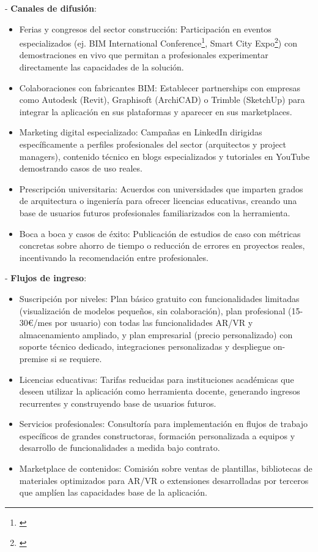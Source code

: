 - \textbf{Canales de difusión}:
\begin{itemize}
\item Ferias y congresos del sector construcción: Participación en eventos especializados (ej. BIM International Conference\footnote{\cite{eubim}}, Smart City Expo\footnote{\cite{smartcityexpo}}) con demostraciones en vivo que permitan a profesionales experimentar directamente las capacidades de la solución.
\item Colaboraciones con fabricantes BIM: Establecer partnerships con empresas como Autodesk (Revit), Graphisoft (ArchiCAD) o Trimble (SketchUp) para integrar la aplicación en sus plataformas y aparecer en sus marketplaces.
\item Marketing digital especializado: Campañas en LinkedIn dirigidas específicamente a perfiles profesionales del sector (arquitectos y project managers), contenido técnico en blogs especializados y tutoriales en YouTube demostrando casos de uso reales.
\item Prescripción universitaria: Acuerdos con universidades que imparten grados de arquitectura o ingeniería para ofrecer licencias educativas, creando una base de usuarios futuros profesionales familiarizados con la herramienta.
\item Boca a boca y casos de éxito: Publicación de estudios de caso con métricas concretas sobre ahorro de tiempo o reducción de errores en proyectos reales, incentivando la recomendación entre profesionales.
\end{itemize}
- \textbf{Flujos de ingreso}:
\begin{itemize}
\item Suscripción por niveles: Plan básico gratuito con funcionalidades limitadas (visualización de modelos pequeños, sin colaboración), plan profesional (15-30€/mes por usuario) con todas las funcionalidades AR/VR y almacenamiento ampliado, y plan empresarial (precio personalizado) con soporte técnico dedicado, integraciones personalizadas y despliegue on-premise si se requiere.
\item Licencias educativas: Tarifas reducidas para instituciones académicas que deseen utilizar la aplicación como herramienta docente, generando ingresos recurrentes y construyendo base de usuarios futuros.
\item Servicios profesionales: Consultoría para implementación en flujos de trabajo específicos de grandes constructoras, formación personalizada a equipos y desarrollo de funcionalidades a medida bajo contrato.
\item Marketplace de contenidos: Comisión sobre ventas de plantillas, bibliotecas de materiales optimizados para AR/VR o extensiones desarrolladas por terceros que amplíen las capacidades base de la aplicación.
\end{itemize}
